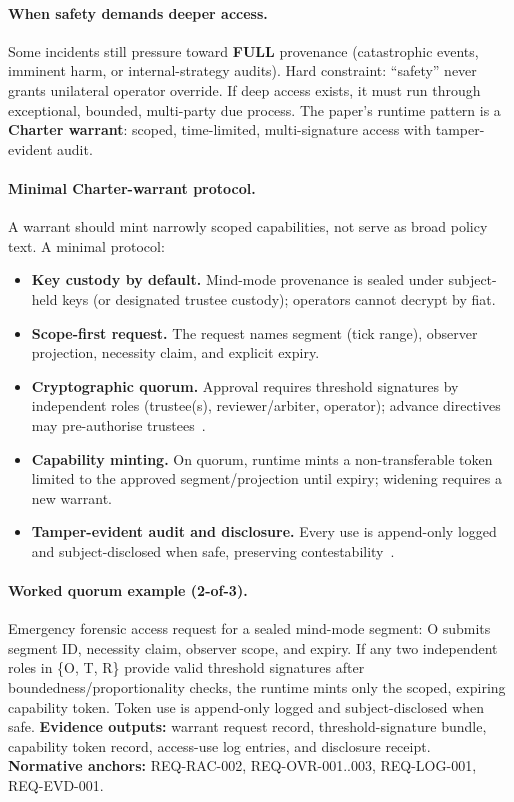 \documentclass[11pt]{article}
\theoremstyle{definition}
\theoremstyle{plain}
\theoremstyle{remark}
\begin{document}
\paragraph{When safety demands deeper access.}
Some incidents still pressure toward \textbf{FULL} provenance (catastrophic events, imminent harm, or internal-strategy audits).
Hard constraint: ``safety'' never grants unilateral operator override.
If deep access exists, it must run through exceptional, bounded, multi-party due process.
The paper’s runtime pattern is a \textbf{Charter warrant}: scoped, time-limited, multi-signature access with tamper-evident audit.

\paragraph{Minimal Charter-warrant protocol.}
A warrant should mint narrowly scoped capabilities, not serve as broad policy text.
A minimal protocol:

\begin{itemize}[leftmargin=*]
  \item \textbf{Key custody by default.}
    Mind-mode provenance is sealed under subject-held keys (or designated trustee custody); operators cannot decrypt by fiat.
  \item \textbf{Scope-first request.}
    The request names segment (tick range), observer projection, necessity claim, and explicit expiry.
  \item \textbf{Cryptographic quorum.}
    Approval requires threshold signatures by independent roles (trustee(s), reviewer/arbiter, operator); advance directives may pre-authorise trustees~\cite{shamir1979}.
  \item \textbf{Capability minting.}
    On quorum, runtime mints a non-transferable token limited to the approved segment/projection until expiry; widening requires a new warrant.
  \item \textbf{Tamper-evident audit and disclosure.}
    Every use is append-only logged and subject-disclosed when safe, preserving contestability~\cite{schneierkelsey1999,merkle1989}.
\end{itemize}

\paragraph{Worked quorum example (2-of-3).}
Emergency forensic access request for a sealed mind-mode segment: O submits segment ID, necessity claim, observer scope, and expiry.
If any two independent roles in \{O, T, R\} provide valid threshold signatures after boundedness/proportionality checks, the runtime mints only the scoped, expiring capability token.
Token use is append-only logged and subject-disclosed when safe.
\noindent\textbf{Evidence outputs:} warrant request record, threshold-signature bundle, capability token record, access-use log entries, and disclosure receipt. \\
\textbf{Normative anchors:} REQ-RAC-002, REQ-OVR-001..003, REQ-LOG-001, REQ-EVD-001.
\end{document}
